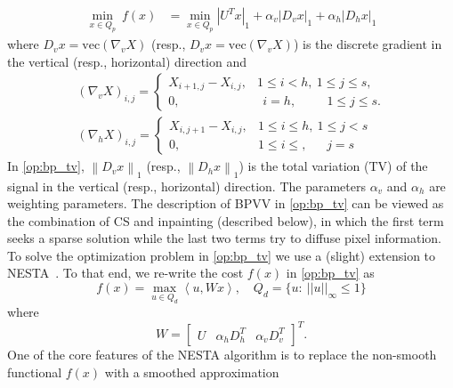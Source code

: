 \documentclass[twocolumn,twoside]{IEEEtran/IEEEtran}
\begin{document}
\begin{align}
  \min_{x\in Q_p}~f(x) &= \min_{x\in Q_p} |U^Tx|_1 + \alpha_v|D_vx|_1 + \alpha_h|D_hx|_1  \label{op:bp_tv}
\end{align}
where ${D_v x=\text{vec}(\nabla_v X)}$ (resp., ${D_v x=\text{vec}(\nabla_v X)}$) is the
discrete gradient in the vertical (resp., horizontal) direction and
\begin{align*}
  (\nabla_v X)_{i,j} = 
  \begin{cases}
    X_{i+1,j} - X_{i,j}, & 1\leq i<h,~ 1\leq j\leq s,\\
    0, & \phantom{:}i=h,~\phantom{:::::} 1\leq j\leq s.
  \end{cases}\\
  (\nabla_h X)_{i,j} = 
  \begin{cases}
    X_{i,j+1} - X_{i,j}, & 1\leq i\leq h,~1\leq j<s \\
    0, & \phantom{}1\leq i\leq,~\phantom{:::} j=s
  \end{cases}
\end{align*}
In \eqref{op:bp_tv}, $\left \| D_v x \right \|_1$ (resp., $\left \| D_h x \right \|_1$) is the total variation (TV) of the signal in the vertical (resp., horizontal) direction. The parameters $\alpha_v$ and $\alpha_h$ are weighting parameters.
The description of BPVV in \eqref{op:bp_tv} can be viewed as the combination of CS
and inpainting (described below), in which the first term seeks a sparse solution while the
last two terms try to diffuse pixel information.
To solve the optimization problem in \eqref{op:bp_tv} we use a (slight) extension to NESTA~\cite{becker_nesta_2011}. To that end, we re-write the cost $f(x)$ in \eqref{op:bp_tv} as
\begin{equation*}
  f(x) = \max_{u\in Q_d} \left\langle u, Wx \right\rangle,\quad Q_d = \{u:~||u||_{\infty} \leq 1\}
\end{equation*}
where 
\begin{equation*}
W = \begin{bmatrix}U&\alpha_hD^T_h&\alpha_vD^T_v \end{bmatrix}^T.
\end{equation*}
One of the core features of the NESTA algorithm is to replace the non-smooth functional $f(x)$ with a smoothed approximation
\end{document}

